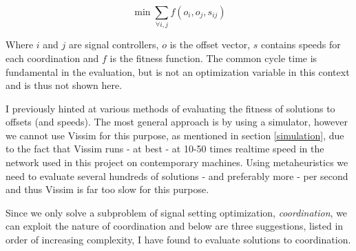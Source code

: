 $$ \min \sum_{\forall i,j} f(o_i,o_j,s_{ij})$$

Where $i$ and $j$ are signal controllers, $o$ is the offset vector, $s$ contains speeds for each coordination and $f$ is the fitness function. The common cycle time is fundamental in the evaluation, but is not an optimization variable in this context and is thus not shown here.

I previously hinted at various methods of evaluating the fitness of solutions to offsets (and speeds). The most general approach is by using a simulator, however we cannot use Vissim for this purpose, as mentioned in section \ref{simulation}, due to the fact that Vissim runs - at best - at 10-50 times realtime speed in the network used in this project on contemporary machines. Using metaheuristics we need to evaluate several hundreds of solutions - and preferably more - per second and thus Vissim is far too slow for this purpose.

Since we only solve a subproblem of signal setting optimization, \textit{coordination}, we can exploit the nature of coordination and below are three suggestions, listed in order of increasing complexity, I have found to evaluate solutions to coordination.

